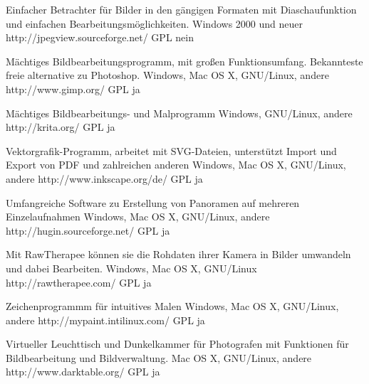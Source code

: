 \documentclass[11pt,a4paper,landscape,twocolumn]{article}
\begin{document}

{Einfacher Betrachter für Bilder in den gängigen Formaten mit Diaschaufunktion und einfachen Bearbeitungsmöglichkeiten.}
{Windows 2000 und neuer}
{http://jpegview.sourceforge.net/}
{GPL}
{nein}

{Mächtiges Bildbearbeitungsprogramm, mit großen Funktionsumfang. Bekannteste freie alternative zu Photoshop.}
{Windows, Mac OS X, GNU/Linux, andere}
{http://www.gimp.org/}
{GPL}
{ja}

{Mächtiges Bildbearbeitungs- und Malprogramm}
{Windows, GNU/Linux, andere}
{http://krita.org/}
{GPL}
{ja}

{Vektorgrafik-Programm, arbeitet mit SVG-Dateien, unterstützt Import und Export von PDF und zahlreichen anderen}
{Windows, Mac OS X, GNU/Linux, andere}
{http://www.inkscape.org/de/}
{GPL}
{ja}

\newpage %

{Umfangreiche Software zu Erstellung von Panoramen auf mehreren Einzelaufnahmen}
{Windows, Mac OS X, GNU/Linux, andere}
{http://hugin.sourceforge.net/}
{GPL}
{ja}

{Mit RawTherapee können sie die Rohdaten ihrer Kamera in Bilder umwandeln und dabei Bearbeiten.}
{Windows, Mac OS X, GNU/Linux}
{http://rawtherapee.com/ }
{GPL}
{ja}

{Zeichenprogrammm für intuitives Malen}
{Windows, Mac OS X, GNU/Linux, andere}
{http://mypaint.intilinux.com/}
{GPL}
{ja}

{Virtueller Leuchttisch und Dunkelkammer für Photografen mit Funktionen für Bildbearbeitung und Bildverwaltung.}
{Mac OS X, GNU/Linux, andere}
{http://www.darktable.org/}
{GPL}
{ja}
\end{document}
